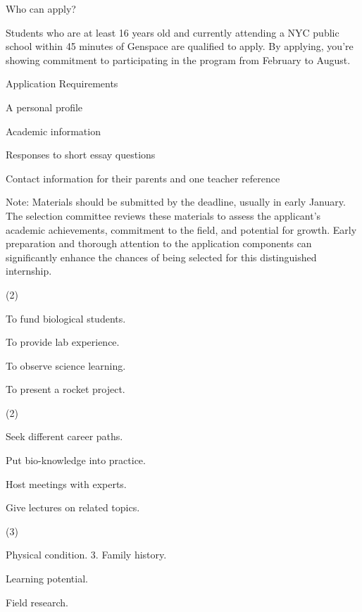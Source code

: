 \documentclass{英语试卷}
\begin{document}
\par Who can apply?\par
\par Students who are at least 16 years old and currently attending a NYC public school within 45 minutes of Genspace are qualified to apply. By applying, you're showing commitment to participating in the program from February to August.\par
\par Application Requirements\par
\par A personal profile\par
\par Academic information\par
\par Responses to short essay questions\par
\par Contact information for their parents and one teacher reference\par
\par Note: Materials should be submitted by the deadline, usually in early January. The selection committee reviews these materials to assess the applicant's academic achievements, commitment to the field, and potential for growth. Early preparation and thorough attention to the application components can significantly enhance the chances of being selected for this distinguished internship.\par
{}
\begin{choices}(2)
  \item To fund biological students.
  \item To provide lab experience.
  \item To observe science learning.
  \item To present a rocket project.
\end{choices}
\begin{choices}(2)
  \item Seek different career paths.
  \item Put bio-knowledge into practice.
  \item Host meetings with experts.
  \item Give lectures on related topics.
\end{choices}
\begin{choices}(3)
  \item Physical condition. 3. Family history.
  \item Learning potential.
  \item Field research.
\end{choices}
\end{document}
